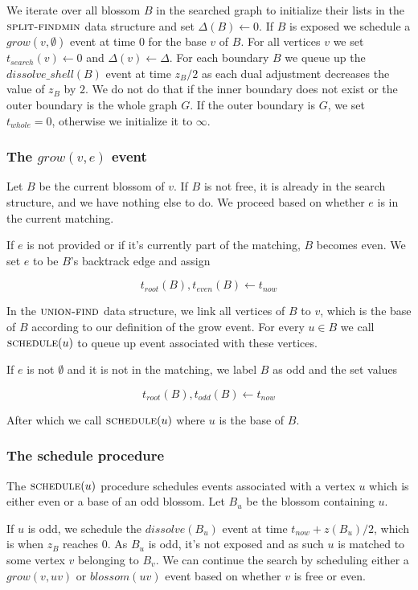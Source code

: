 We iterate over all blossom $B$ in the searched graph to initialize their lists in the $\textsc{split-findmin}$ data structure and set $\Delta(B) \gets 0$. If $B$ is exposed we schedule a $grow(v, \emptyset)$ event at time $0$ for the base $v$ of $B$. For all vertices $v$ we set $t_{search}(v) \gets 0$ and $\Delta(v) \gets \Delta$. For each boundary $B$ we queue up the $dissolve\_shell(B)$ event at time $z_B / 2$ as each dual adjustment decreases the value of $z_B$ by $2$. We do not do that if the inner boundary does not exist or the outer boundary is the whole graph $G$. If the outer boundary is $G$, we set $t_{whole} = 0$, otherwise we initialize it to $\infty$.

\subsubsection*{The $grow(v, e)$ event}
Let $B$ be the current blossom of $v$. If $B$ is not free, it is already in the search structure, and we have nothing else to do. We proceed based on whether $e$ is in the current matching.

If $e$ is not provided or if it's currently part of the matching, $B$ becomes even. We set $e$ to be $B$'s backtrack edge and assign

\[ t_{root}(B), t_{even}(B) \gets t_{now} \]

In the $\textsc{union-find}$ data structure, we link all vertices of $B$ to $v$, which is the base of $B$ according to our definition of the grow event. For every $u \in B$ we call $\textsc{schedule}(u)$ to queue up event associated with these vertices.

If $e$ is not $\emptyset$ and it is not in the matching, we label $B$ as odd and the set values

\[ t_{root}(B), t_{odd}(B) \gets t_{now} \]

After which we call $\textsc{schedule}(u)$ where $u$ is the base of $B$.

\subsubsection*{The schedule procedure}
The $\textsc{schedule}(u)$ procedure schedules events associated with a vertex $u$ which is either even or a base of an odd blossom. Let $B_u$ be the blossom containing $u$. 

If $u$ is odd, we schedule the $dissolve(B_u)$ event at time $t_{now} + z(B_u) / 2$, which is when $z_B$ reaches $0$. As $B_u$ is odd, it's not exposed and as such $u$ is matched to some vertex $v$ belonging to $B_v$. We can continue the search by scheduling either a $grow(v, uv)$ or $blossom(uv)$ event based on whether $v$ is free or even.

